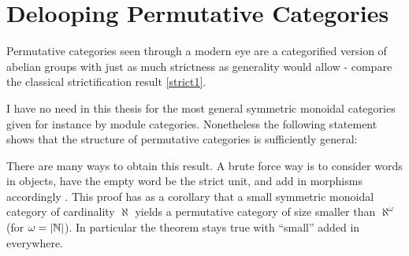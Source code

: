 \section{Delooping Permutative Categories}
Permutative categories seen through a modern eye are a categorified
version of abelian groups with just as much strictness as generality
would allow - compare the classical strictification result \ref{strict1}.
{}

I have no need in this thesis for the most general symmetric monoidal 
categories given for instance by module categories. Nonetheless the 
following statement shows that the structure of permutative 
categories is sufficiently general:

{}

There are many ways to obtain this result. A brute force way is to
consider words in objects, have the empty word be the strict unit, and
add in morphisms accordingly 
\cite[Prop VI.3.2,cf. pp.155-157]{MayEinf}. This proof has as a 
corollary that a small symmetric monoidal category of cardinality 
$\aleph$ yields a permutative category of size smaller than 
$\aleph^\omega$ (for $\omega=|\mathbb{N}|$). In particular the theorem stays 
true with ``small'' added in everywhere.

